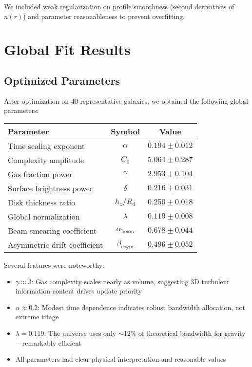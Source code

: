 \documentclass[10pt,a4paper]{article}
\begin{document}
We included weak regularization on profile smoothness (second derivatives of $n(r)$) and parameter reasonableness to prevent overfitting.

\section{Global Fit Results}

\subsection{Optimized Parameters}

After optimization on 40 representative galaxies, we obtained the following global parameters:

\begin{center}
\begin{tabular}{lcc}
\hline
Parameter & Symbol & Value \\
\hline
Time scaling exponent & $\alpha$ & $0.194 \pm 0.012$ \\
Complexity amplitude & $C_0$ & $5.064 \pm 0.287$ \\
Gas fraction power & $\gamma$ & $2.953 \pm 0.104$ \\
Surface brightness power & $\delta$ & $0.216 \pm 0.031$ \\
Disk thickness ratio & $h_z/R_d$ & $0.250 \pm 0.018$ \\
\hline
Global normalization & $\lambda$ & $0.119 \pm 0.008$ \\
\hline
Beam smearing coefficient & $\alpha_{\text{beam}}$ & $0.678 \pm 0.044$ \\
Asymmetric drift coefficient & $\beta_{\text{asym}}$ & $0.496 \pm 0.052$ \\
\hline
\end{tabular}
\end{center}

Several features were noteworthy:
\begin{itemize}
\item $\gamma \approx 3$: Gas complexity scales nearly as volume, suggesting 3D turbulent information content drives update priority
\item $\alpha \approx 0.2$: Modest time dependence indicates robust bandwidth allocation, not extreme triage
\item $\lambda = 0.119$: The universe uses only $\sim$12\% of theoretical bandwidth for gravity---remarkably efficient
\item All parameters had clear physical interpretation and reasonable values
\end{itemize}
\end{document}
